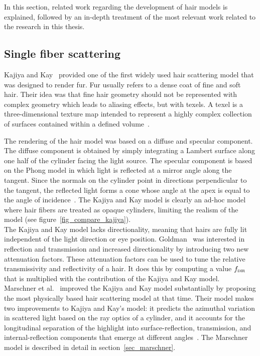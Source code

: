 \documentclass[11pt,a4paper]{report}
\begin{document}
In this section, related work regarding the development of hair models is explained, followed by an in-depth treatment of the most relevant work related to the research in this thesis.


\subsection{Single fiber scattering}

Kajiya and Kay~\cite{kajiya} provided one of the first widely used hair scattering model that was designed to render fur. Fur usually refers to a  dense coat of fine and soft hair. Their idea was that fine hair geometry should not be represented with complex geometry which leads to aliasing effects, but with texels. A texel is a three-dimensional texture map intended to represent a highly complex collection of surfaces contained within a defined volume~\cite{kajiya}.

The rendering of the hair model was based on a diffuse and specular component. The diffuse component is obtained by simply integrating a Lambert surface along one half of the cylinder facing the light source. The specular component is based on the Phong model in which light is reflected at a mirror angle along the tangent. Since the normals on the cylinder point in directions perpendicular to the tangent, the reflected light forms a cone whose angle at the apex is equal to the angle of incidence~\cite{kajiya}. The Kajiya and Kay model is clearly an ad-hoc model where hair fibers are treated as opaque cylinders, limiting the realism of the model (see figure~\ref{fig_compare_kajiya}).\\

The Kajiya and Kay model lacks directionality, meaning that hairs are fully lit independent of the light direction or eye position. Goldman~\cite{goldman} was interested in reflection and transmission and increased directionality by introducing two new attenuation factors. These attenuation factors can be used to tune the relative transmissivity and reflectivity of a hair. It does this by computing a value $f_{\textsc{dir}}$ that is multiplied with the contribution of the Kajiya and Kay model.\\

Marschner et al.~\cite{marschner} improved the Kajiya and Kay model substantially by proposing the most physically based hair scattering model at that time. Their model makes two improvements to Kajiya and Kay's model: it predicts the azimuthal variation in scattered light based on the ray optics of a cylinder, and it accounts for the longitudinal separation of the highlight into surface-reflection, transmission, and internal-reflection components that emerge at different angles~\cite{hadap}. The Marschner model is described in detail in section~\ref{sec_marschner}.
\end{document}
